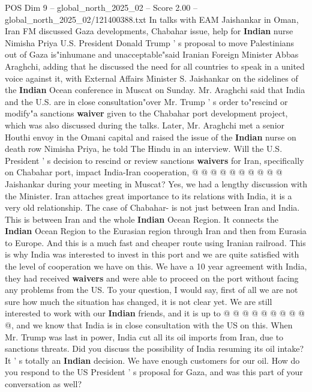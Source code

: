 \begin{textsample}{POS Dim 9 – global\_north\_2025\_02 – Score 2.00 – global\_north\_2025\_02/121400388.txt}  \label{ex:f9_pos_387}
In talks with EAM Jaishankar in Oman, Iran FM discussed Gaza developments, Chabahar issue, help for \textbf{Indian} nurse Nimisha Priya U.S.
President Donald Trump ' s proposal to move Palestinians out of Gaza is"inhumane and unacceptable"said Iranian Foreign Minister Abbas Araghchi, adding that he discussed the need for all countries to speak in a united voice against it, with External Affairs Minister S.
Jaishankar on the sidelines of the \textbf{Indian} Ocean conference in Muscat on Sunday.
Mr.
Araghchi said that India and the U.S. are in close consultation"over Mr.
Trump ' s order to"rescind or modify"a sanctions \textbf{waiver} given to the Chabahar port development project, which was also discussed during the talks.
Later, Mr.
Araghchi met a senior Houthi envoy in the Omani capital and raised the issue of the \textbf{Indian} nurse on death row Nimisha Priya, he told The Hindu in an interview.
Will the U.S.
President ' s decision to rescind or review sanctions \textbf{waivers} for Iran, specifically on Chabahar port, impact India-Iran cooperation, @ @ @ @ @ @ @ @ @ @ Jaishankar during your meeting in Muscat?
Yes, we had a lengthy discussion with the Minister.
Iran attaches great importance to its relations with India, it is a very old relationship.
The case of Chabahar- is not just between Iran and India.
This is between Iran and the whole \textbf{Indian} Ocean Region.
It connects the \textbf{Indian} Ocean Region to the Eurasian region through Iran and then from Eurasia to Europe.
And this is a much fast and cheaper route using Iranian railroad.
This is why India was interested to invest in this port and we are quite satisfied with the level of cooperation we have on this.
We have a 10 year agreement with India, they had received \textbf{waivers} and were able to proceed on the port without facing any problems from the US.
To your question, I would say, first of all we are not sure how much the situation has changed, it is not clear yet.
We are still interested to work with our \textbf{Indian} friends, and it is up to @ @ @ @ @ @ @ @ @ @, and we know that India is in close consultation with the US on this.
When Mr.
Trump was last in power, India cut all its oil imports from Iran, due to sanctions threats.
Did you discuss the possibility of India resuming its oil intake?
It ' s totally an \textbf{Indian} decision.
We have enough customers for our oil.
How do you respond to the US President ' s proposal for Gaza, and was this part of your conversation as well?

\end{textsample}
